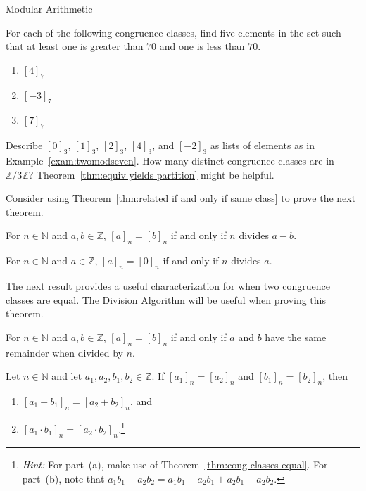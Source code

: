 \begin{section}{Modular Arithmetic}
\begin{problem}
For each of the following congruence classes, find five elements in the set such that at least one is greater than $70$ and one is less than $70$.
\begin{enumerate}[label=\textrm{(\alph*)}]
\item $[4]_7$ 
\item $[-3]_7$
\item $[7]_7$
\end{enumerate}
\end{problem}

\begin{problem}
Describe $[0]_3$, $[1]_3$, $[2]_3$, $[4]_3$, and $[-2]_3$ as lists of elements as in Example~\ref{exam:twomodseven}. How many distinct congruence classes are in $\mathbb{Z}/3\mathbb{Z}$? Theorem~\ref{thm:equiv yields partition} might be helpful.
\end{problem}

Consider using Theorem~\ref{thm:related if and only if same class} to prove the next theorem.

\begin{theorem}\label{thm:cong classes equal}
For $n\in \mathbb{N}$ and $a,b\in \mathbb{Z}$, $[a]_n = [b]_n$ if and only if $n$ divides $a-b$. 
\end{theorem}

\begin{corollary}\label{cor:divisible iff zero mod}
For $n\in \mathbb{N}$ and $a\in \mathbb{Z}$, $[a]_n = [0]_n$ if and only if $n$ divides $a$.
\end{corollary}

The next result provides a useful characterization for when two congruence classes are equal. The Division Algorithm will be useful when proving this theorem.

\begin{theorem}
For $n\in \mathbb{N}$ and $a,b\in \mathbb{Z}$, $[a]_n = [b]_n$ if and only if $a$ and $b$ have the same remainder when divided by $n$. 
\end{theorem}

\begin{theorem}
Let $n\in \mathbb{N}$ and let $a_1,a_2,b_1,b_2 \in \mathbb{Z}$. If $[a_1]_n = [a_2]_n$ and $[b_1]_n = [b_2]_n$, then 
\begin{enumerate}[label=\textrm{(\alph*)}]
\item $[a_1+b_1]_n = [a_2+b_2]_n$, and
\item $[a_1\cdot b_1]_n = [a_2\cdot b_2]_n$.\footnote{\emph{Hint:} For part~(a), make use of Theorem~\ref{thm:cong classes equal}. For part~(b), note that $a_1b_1-a_2b_2 = a_1b_1 -a_2b_1 + a_2b_1-a_2b_2$.}
\end{enumerate}
\end{theorem}


\end{section}
